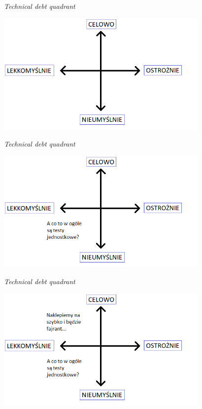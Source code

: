 \documentclass{beamer}
\begin{document}
\begin{frame}{\textit{Technical debt quadrant}}
\begin{center}
  	\includegraphics[height=6cm]{technical_debt_quadrant2.png}
\end{center}
\end{frame}

\begin{frame}{\textit{Technical debt quadrant}}
\begin{center}
  	\includegraphics[height=6cm]{technical_debt_quadrant3.png}
\end{center}
\end{frame}

\begin{frame}{\textit{Technical debt quadrant}}
\begin{center}
  	\includegraphics[height=6cm]{technical_debt_quadrant4.png}
\end{center}
\end{frame}
\end{document}

